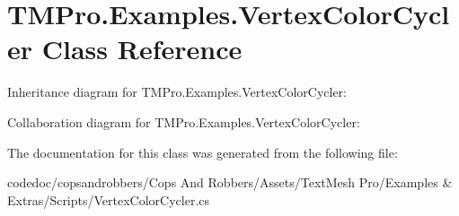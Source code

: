 \hypertarget{classTMPro_1_1Examples_1_1VertexColorCycler}{}\section{T\+M\+Pro.\+Examples.\+Vertex\+Color\+Cycler Class Reference}
\label{classTMPro_1_1Examples_1_1VertexColorCycler}


Inheritance diagram for T\+M\+Pro.\+Examples.\+Vertex\+Color\+Cycler\+:


Collaboration diagram for T\+M\+Pro.\+Examples.\+Vertex\+Color\+Cycler\+:


The documentation for this class was generated from the following file\+:\begin{DoxyCompactItemize}
\item 
codedoc/copsandrobbers/\+Cops And Robbers/\+Assets/\+Text\+Mesh Pro/\+Examples \& Extras/\+Scripts/Vertex\+Color\+Cycler.\+cs\end{DoxyCompactItemize}
